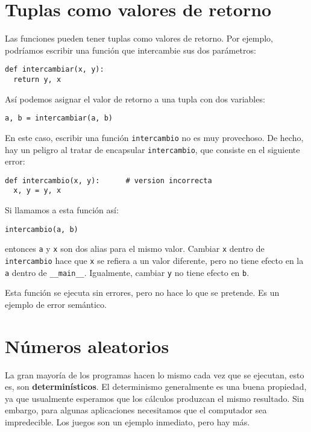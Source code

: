\section{Tuplas como valores de retorno}

  

Las funciones pueden tener tuplas como valores de retorno. Por ejemplo,
podríamos escribir una función que intercambie sus dos parámetros:
\begin{lstlisting}
def intercambiar(x, y):
  return y, x
\end{lstlisting}

Así podemos asignar el valor de retorno a una tupla con dos variables:
\begin{lstlisting}
a, b = intercambiar(a, b)
\end{lstlisting}

En este caso, escribir una función \texttt{intercambio} no es muy
provechoso. De hecho, hay un peligro al tratar de encapsular \texttt{intercambio},
que consiste en el siguiente error:
\begin{lstlisting}
def intercambio(x, y):      # version incorrecta
  x, y = y, x
\end{lstlisting}

Si llamamos a esta función así:
\begin{lstlisting}
intercambio(a, b)
\end{lstlisting}

entonces \texttt{a} y \texttt{x} son dos alias para el mismo valor.
Cambiar \texttt{x} dentro de \texttt{intercambio} hace que \texttt{x}
se refiera a un valor diferente, pero no tiene efecto en la \texttt{a}
dentro de \texttt{\_\_main\_\_}. Igualmente, cambiar \texttt{y} no
tiene efecto en \texttt{b}.

Esta función se ejecuta sin errores, pero no hace lo que se pretende.
Es un ejemplo de error semántico.


\section{Números aleatorios}

 

La gran mayoría de los programas hacen lo mismo cada vez que se ejecutan,
esto es, son \textbf{determinísticos}. El determinismo generalmente
es una buena propiedad, ya que usualmente esperamos que los cálculos
produzcan el mismo resultado. Sin embargo, para algunas aplicaciones
necesitamos que el computador sea impredecible. Los juegos son un
ejemplo inmediato, pero hay más.

